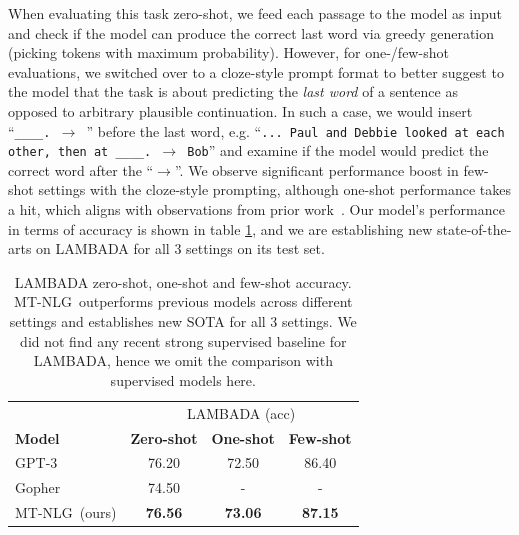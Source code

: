 \documentclass[11pt]{article}
\newcommand{\ours}{MT-NLG}
\begin{document}
When evaluating this task zero-shot, we feed each passage to the model as input and check if the model can produce the correct last word via greedy generation (picking tokens with maximum probability). However, for one-/few-shot evaluations, we switched over to a cloze-style prompt format to better suggest to the model that the task is about predicting the \emph{last word} of a sentence as opposed to arbitrary plausible continuation. In such a case, we would insert ``\texttt{\_\_\_\_. $\rightarrow$ }'' before the last word, e.g. ``\texttt{... Paul and Debbie looked at each other, then at \_\_\_\_. $\rightarrow$ Bob}'' and examine if the model would predict the correct word after the ``$\rightarrow$''. We observe significant performance boost in few-shot settings with the cloze-style prompting, although one-shot performance takes a hit, which aligns with observations from prior work~\citep{brown2020language}. Our model's performance in terms of accuracy is shown in table \ref{tab:lambada-perf}, and we are establishing new state-of-the-arts on LAMBADA for all 3 settings on its test set.


\begin{table}[t]
\centering
\small
\begin{tabular}{l c c c}
 \toprule
 & \multicolumn{3}{c}{LAMBADA (acc)} \\
 \cmidrule{2-4}
 \textbf{Model} &  \textbf{Zero-shot}  &  \textbf{One-shot} &  \textbf{Few-shot} \\
 \midrule
 GPT-3  &   76.20   &   72.50   &   86.40  \\
 Gopher  &   74.50   &   -   &   -  \\
 \ours~(ours)	&	\textbf{76.56}	&	\textbf{73.06}	&	\textbf{87.15}	\\
 \bottomrule
\end{tabular}
\caption{LAMBADA zero-shot, one-shot and few-shot accuracy. \ours~outperforms previous models across different settings and establishes new SOTA for all 3 settings. We did not find any recent strong supervised baseline for LAMBADA, hence we omit the comparison with supervised models here.}
\label{tab:lambada-perf}
\end{table}
\end{document}
